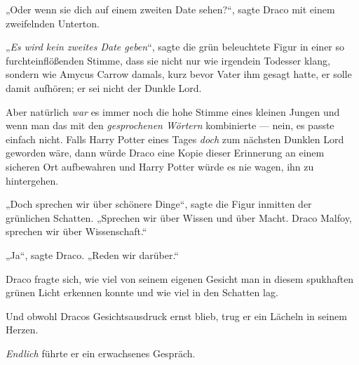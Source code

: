 „Oder wenn sie dich auf einem zweiten Date sehen?“, sagte Draco mit einem zweifelnden Unterton.

„\emph{Es wird kein zweites Date geben}“, sagte die grün beleuchtete Figur in einer so furchteinflößenden Stimme, dass sie nicht nur wie irgendein Todesser klang, sondern wie Amycus Carrow damals, kurz bevor Vater ihm gesagt hatte, er solle damit aufhören; er sei nicht der Dunkle Lord.

Aber natürlich \emph{war} es immer noch die hohe Stimme eines kleinen Jungen und wenn man das mit den \emph{gesprochenen Wörtern} kombinierte — nein, es passte einfach nicht. Falls Harry Potter eines Tages \emph{doch} zum nächsten Dunklen Lord geworden wäre, dann würde Draco eine Kopie dieser Erinnerung an einem sicheren Ort aufbewahren und Harry Potter würde es nie wagen, ihn zu hintergehen.

„Doch sprechen wir über schönere Dinge“, sagte die Figur inmitten der grünlichen Schatten.
„Sprechen wir über Wissen und über Macht. Draco Malfoy, sprechen wir über Wissenschaft.“

„Ja“, sagte Draco.
„Reden wir darüber.“

Draco fragte sich, wie viel von seinem eigenen Gesicht man in diesem spukhaften grünen Licht erkennen konnte und wie viel in den Schatten lag.

Und obwohl Dracos Gesichtsausdruck ernst blieb, trug er ein Lächeln in seinem Herzen.

\emph{Endlich} führte er ein erwachsenes Gespräch.

